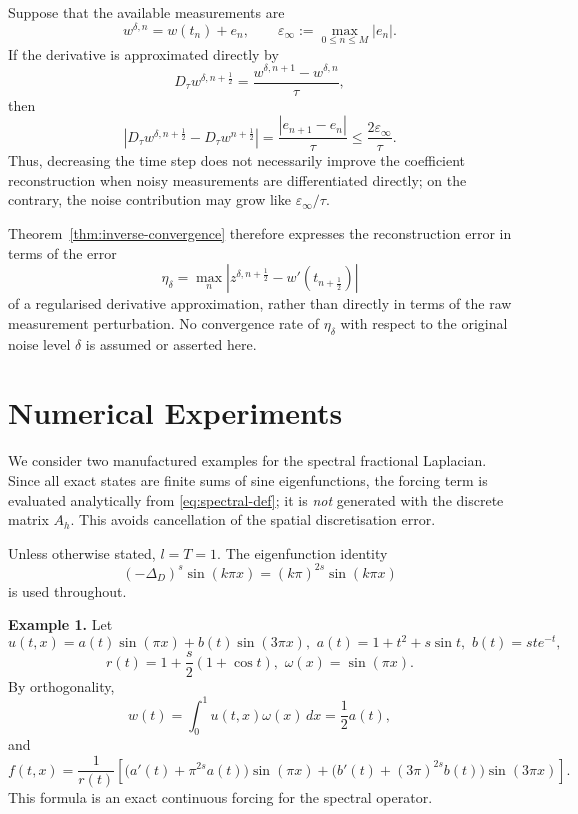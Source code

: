 \documentclass[reqno]{amsart}
\newcommand{\Ah}{A_h}
\begin{document}
\begin{remark}
\label{rem:raw-noise}
Suppose that the available measurements are
\[
w^{\delta,n}
=
w(t_n)+e_n,
\qquad
\varepsilon_\infty
:=
\max_{0\le n\le M}|e_n|.
\]
If the derivative is approximated directly by
\[
D_\tau w^{\delta,n+\frac12}
=
\frac{w^{\delta,n+1}-w^{\delta,n}}{\tau},
\]
then
\[
\left|
D_\tau w^{\delta,n+\frac12}
-
D_\tau w^{n+\frac12}
\right|
=
\frac{|e_{n+1}-e_n|}{\tau}
\le
\frac{2\varepsilon_\infty}{\tau}.
\]
Thus, decreasing the time step does not necessarily improve the
coefficient reconstruction when noisy measurements are differentiated
directly; on the contrary, the noise contribution may grow like
\(\varepsilon_\infty/\tau\).

Theorem~\ref{thm:inverse-convergence} therefore expresses the
reconstruction error in terms of the error
\[
\eta_\delta
=
\max_n
\left|
z^{\delta,n+\frac12}
-
w'(t_{n+\frac12})
\right|
\]
of a regularised derivative approximation, rather than directly in
terms of the raw measurement perturbation.
No convergence rate of \(\eta_\delta\) with respect to the original
noise level \(\delta\) is assumed or asserted here.
\end{remark}

\section{Numerical Experiments}\label{5}
We consider two manufactured examples for the spectral fractional Laplacian. Since all exact states are finite sums of sine eigenfunctions, the forcing term is evaluated analytically from \eqref{eq:spectral-def}; it is \emph{not} generated with the discrete matrix $\Ah$. This avoids cancellation of the spatial discretisation error.

Unless otherwise stated, $l=T=1$. The eigenfunction identity
\[
 ( -\Delta_D)^s\sin(k\pi x)=(k\pi)^{2s}\sin(k\pi x)
\]
is used throughout.

\noindent\textbf{Example 1.}
Let
\[
 u(t,x)=a(t)\sin(\pi x)+b(t)\sin(3\pi x),\,\,
 a(t)=1+t^2+s\sin t,\,\, b(t)=s t e^{-t},
\]
\[
 r(t)=1+\frac{s}{2}(1+\cos t),\,\, \omega(x)=\sin(\pi x).
\]
By orthogonality,
\[
 w(t)=\int_0^1u(t,x)\omega(x)\,dx=\frac12a(t),
\]
and
\[
 f(t,x)=\frac{1}{r(t)}\left[
 \bigl(a'(t)+\pi^{2s}a(t)\bigr)\sin(\pi x)
 +\bigl(b'(t)+(3\pi)^{2s}b(t)\bigr)\sin(3\pi x)
 \right].
\]
This formula is an exact continuous forcing for the spectral operator.
\end{document}
